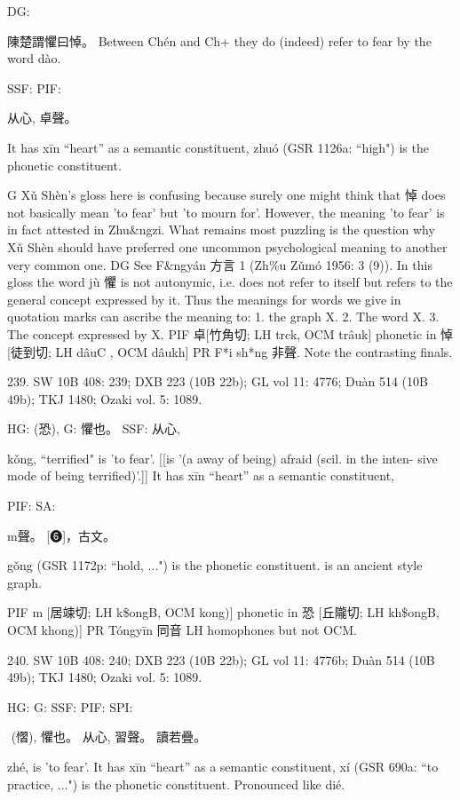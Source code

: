 DG:

陳楚謂懼曰悼。 Between Chén and Ch+ they do (indeed) refer to fear by the word dào.

SSF: PIF:

从心, 卓聲。

It has xīn ``heart'' as a semantic constituent,
zhuó (GSR 1126a: ``high") is the phonetic constituent.

G Xǔ Shèn's gloss here is confusing because surely one might think that 悼 does not basically mean 'to fear' but 'to mourn for'. However, the meaning 'to fear' is in fact attested in Zhu&ngzi. What remains most puzzling is the question why Xǔ Shèn should have preferred one uncommon psychological meaning to another very common one.
DG	See F&ngyán 方言 1 (Zh\%u Zǔmó 1956: 3 (9)). In this gloss the word jù 懼 is not autonymic,
i.e. does not refer to itself but refers to the general concept expressed by it. Thus the meanings for words we give in quotation marks can ascribe the meaning to: 1. the graph X. 2. The word X. 3. The concept expressed by X.
PIF     卓[竹角切; LH trck, OCM trâuk] phonetic in 悼 [徒到切; LH dâuC , OCM dâukh]
PR	F*i sh*ng 非聲. Note the contrasting finals.



239. SW 10B 408: 239; DXB 223 (10B 22b); GL vol 11: 4776; Duàn 514 (10B 49b); TKJ 1480; Ozaki vol. 5: 1089.

HG:  (恐),
G:	懼也。
SSF: 从心,


kǒng, ``terrified"
is 'to fear'. [[is '(a away of being) afraid (scil. in the inten- sive mode of being terrified)'.]]
It has xīn ``heart'' as a semantic constituent,

PIF: SA:

m聲。
[❻]，古文。

gǒng (GSR 1172p: ``hold, ...") is the phonetic constituent.  is an ancient style graph.

PIF     m [居竦切; LH k\$ongB, OCM kong)] phonetic in 恐 [丘隴切; LH kh\$ongB, OCM khong)]
PR	Tóngyīn 同音 LH homophones but not OCM.

240. SW 10B 408: 240; DXB 223 (10B 22b); GL vol 11: 4776b; Duàn 514 (10B 49b); TKJ 1480; Ozaki vol. 5: 1089.


HG:
G: SSF: PIF: SPI:

 (慴), 懼也。 从心,
習聲。 讀若疊。


zhé,
is 'to fear'.
It has xīn ``heart'' as a semantic constituent,
xí (GSR 690a: ``to practice, ...") is the phonetic constituent. Pronounced like dié.

